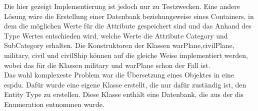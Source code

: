 Die hier gezeigt Implementierung ist jedoch nur zu Testzwecken. Eine andere Lösung wäre die Erstellung einer Datenbank beziehungsweise eines Containers, in dem die möglichen Werte für die Attribute gespeichert sind und das Anhand des  \glqq Type\grqq{}  Wertes entschieden wird, welche Werte die Attribute  \glqq Category\grqq{} und \glqq SubCategory\grqq{} erhalten. Die Konstruktoren der Klassen  \glqq warPlane\grqq{},\glqq civilPlane\grqq{}, \glqq military\grqq{}, \glqq civil\grqq{} und \glqq civilShip\grqq{} können auf die gleiche Weise implementiert werden, wobei das für die Klassen \glqq military\grqq{} und \glqq warPlane\grqq{} schon der Fall ist.\\
Das wohl komplexeste Problem war die Übersetzung eines Objektes in eine \ac{espdu}. Dafür wurde eine eigene Klasse erstellt, die nur dafür zuständig ist, den \glqq Entity Type\grqq{} zu erstellen. Diese Klasse enthält eine Datenbank, die aus der \ac{dis} Enumeration entnommen wurde. 

